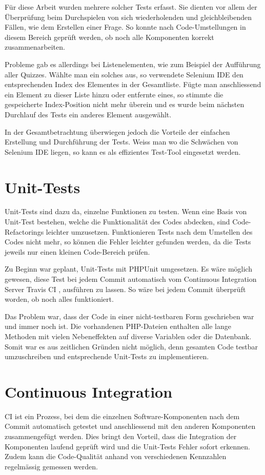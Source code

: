 Für diese Arbeit wurden mehrere solcher Tests erfasst. Sie dienten vor allem der Überprüfung beim Durchspielen von sich wiederholenden und gleichbleibenden Fällen, wie dem Erstellen einer Frage. So konnte nach Code-Umstellungen in diesem Bereich geprüft werden, ob noch alle Komponenten korrekt zusammenarbeiten.

Probleme gab es allerdings bei Listenelementen, wie zum Beispiel der Aufführung aller Quizzes. Wählte man ein solches aus, so verwendete Selenium IDE den entsprechenden Index des Elementes in der Gesamtliste. Fügte man anschliessend ein Element zu dieser Liste hinzu oder entfernte eines, so stimmte die gespeicherte Index-Position nicht mehr überein und es wurde beim nächsten Durchlauf des Tests ein anderes Element ausgewählt.

In der Gesamtbetrachtung überwiegen jedoch die Vorteile der einfachen Erstellung und Durchführung der Tests. Weiss man wo die Schwächen von Selenium IDE liegen, so kann es als effizientes Test-Tool eingesetzt werden.


\section{Unit-Tests}
Unit-Tests sind dazu da, einzelne Funktionen zu testen. Wenn eine Basis von Unit-Test bestehen, welche die Funktionalität des Codes abdecken, sind Code-\gls{Refactoring}s leichter umzusetzen. Funktionieren Tests nach dem Umstellen des Codes nicht mehr, so können die Fehler leichter gefunden werden, da die Tests jeweils nur einen kleinen Code-Bereich prüfen.

Zu Beginn war geplant, Unit-Tests mit PHPUnit \cite{phpunit} umgesetzen. Es wäre möglich gewesen, diese Test bei jedem \gls{Commit} automatisch vom Continuous Integration Server Travis CI \cite{travisCI}, ausführen zu lassen. So wäre bei jedem Commit überprüft worden, ob noch alles funktioniert.

Das Problem war, dass der Code in einer nicht-testbaren Form geschrieben war und immer noch ist. Die vorhandenen PHP-Dateien enthalten alle lange Methoden mit vielen Nebeneffekten auf diverse Variablen oder die Datenbank. Somit war es aus zeitlichen Gründen nicht möglich, denn gesamten Code testbar umzuschreiben und entsprechende Unit-Tests zu implementieren.



\section{Continuous Integration}
\acrfull{CI} ist ein Prozess, bei dem die einzelnen Software-Komponenten nach dem \gls{Commit} automatisch getestet und anschliessend mit den anderen Komponenten zusammengefügt werden. Dies bringt den Vorteil, dass die Integration der Komponenten laufend geprüft wird und die Unit-Tests Fehler sofort erkennen. Zudem kann die Code-Qualität anhand von verschiedenen Kennzahlen regelmässig gemessen werden.


